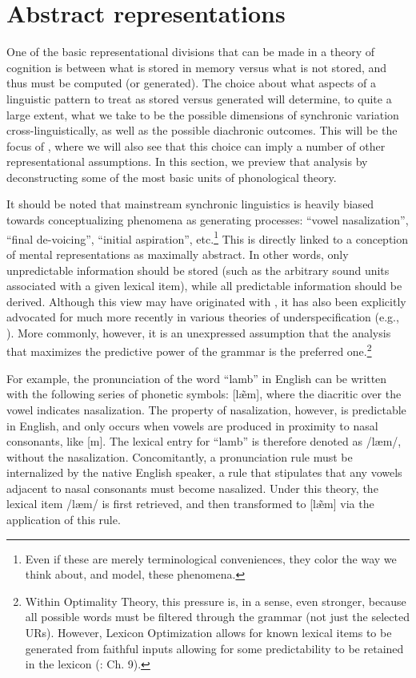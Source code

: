 \section{Abstract representations}

One of the basic representational divisions that can be made in a
theory of cognition is between what is stored in memory versus what
is not stored, and thus must be computed (or generated). The choice
about what aspects of a linguistic pattern to treat as stored versus
generated will determine, to quite a large extent, what we take to
be the possible dimensions of synchronic variation cross-linguistically,
as well as the possible diachronic outcomes. This will be the focus
of , where we will also see that
this choice can imply a number of other representational assumptions.
In this section, we preview that analysis by deconstructing some of
the most basic units of phonological theory.

It should be noted that mainstream synchronic linguistics is heavily
biased towards conceptualizing phenomena as generating processes:
“vowel nasalization”, “final de-voicing”, “initial
aspiration”, etc.\footnote{Even if these are merely terminological conveniences, they color the
way we think about, and model, these phenomena.} This is directly linked to a conception of mental representations
as maximally abstract. In other words, only unpredictable information
should be stored (such as the arbitrary sound units associated with
a given lexical item), while all predictable information should be
derived. Although this view may have originated with \citet{Chomsky1968},
it has also been explicitly advocated for much more recently in various
theories of underspecification (e.g., \citealt{archangeli1988aspects,Steriade1995a}).
More commonly, however, it is an unexpressed assumption that the analysis
that maximizes the predictive power of the grammar is the preferred
one.\footnote{Within Optimality Theory, this pressure is, in a sense, even stronger,
because all possible words must be filtered through the grammar (not
just the selected URs). However, Lexicon Optimization allows for known
lexical items to be generated from faithful inputs allowing for some
predictability to be retained in the lexicon (\citealt{Prince2004}:
Ch. 9). }

For example, the pronunciation of the word “lamb” in English
can be written with the following series of phonetic symbols: {[læ̃m]},
where the diacritic over the vowel indicates nasalization. The property
of nasalization, however, is predictable in English, and only occurs
when vowels are produced in proximity to nasal consonants, like {[}m{]}.
The lexical entry for “lamb” is therefore denoted as {/læm/},
without the nasalization. Concomitantly, a pronunciation rule must
be internalized by the native English speaker, a rule that stipulates
that any vowels adjacent to nasal consonants must become nasalized.
Under this theory, the lexical item {/læm/} is first retrieved,
and then transformed to {[læ̃m]} via the application of
this rule. 

